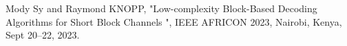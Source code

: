   Mody Sy and Raymond KNOPP, "Low-complexity Block-Based Decoding Algorithms for Short Block Channels ", IEEE AFRICON 2023, Nairobi, Kenya, Sept 20–22, 2023.